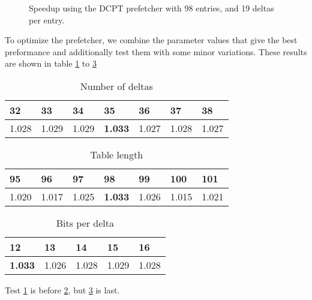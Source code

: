\begin{figure}[h]
    \begin{centering}
        
        \caption{Speedup using the DCPT prefetcher with 98 entries, and 19 deltas per entry.}
        \label{figure:dcpt-delta-bits}
    \end{centering}
\end{figure}
To optimize the prefetcher, we combine the parameter values that give the best preformance and additionally test them with some minor variations. These results are shown in table \ref{tab:numdelta} to \ref{tab:deltabits}



\begin{table}[h]
\centering
\label{tab:numdelta}
\begin{tabular}{|l|l|l|l|l|l|l|}
\hline
32    & 33    & 34    & \textbf{35}    & 36    & 37    & 38    \\ \hline
1.028 & 1.029 & 1.029 & \textbf{1.033} & 1.027 & 1.028 & 1.027 \\ \hline
\end{tabular}
\smallskip
\caption{Number of deltas}
\end{table}


\begin{table}[h]
\centering
\label{tab:tablesize}
\begin{tabular}{|l|l|l|l|l|l|l|}
\hline
95    & 96    & 97    & \textbf{98}    & 99    & 100   & 101   \\ \hline
1.020 & 1.017 & 1.025 & \textbf{1.033} & 1.026 & 1.015 & 1.021 \\ \hline
\end{tabular}
\smallskip
\caption{Table length}
\end{table}


\begin{table}[h]
\centering
\label{tab:deltabits}
\begin{tabular}{|l|l|l|l|l|}
\hline
\textbf{12}    & 13    & 14    & 15    & 16    \\ \hline
\textbf{1.033} & 1.026 & 1.028 & 1.029 & 1.028 \\ \hline
\end{tabular}
\smallskip
\caption{Bits per delta}
\end{table}


Test \ref{tab:numdelta} is before \ref{tab:tablesize}, but \ref{tab:deltabits} is last.



